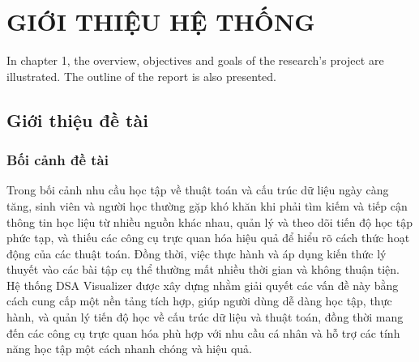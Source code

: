 \chapter{GIỚI THIỆU HỆ THỐNG}
\label{ch:introduction}

In chapter 1, the overview, objectives and goals of the research's project are illustrated. The outline of the report is also presented.

\section{Giới thiệu đề tài}
\label{sec:intro-topic}

\subsection{Bối cảnh đề tài}
\label{subsec:context}

Trong bối cảnh nhu cầu học tập về thuật toán và cấu trúc dữ liệu ngày càng tăng, sinh viên và người học thường gặp khó khăn khi phải tìm kiếm và tiếp cận thông tin học liệu từ nhiều nguồn khác nhau, quản lý và theo dõi tiến độ học tập phức tạp, và thiếu các công cụ trực quan hóa hiệu quả để hiểu rõ cách thức hoạt động của các thuật toán. Đồng thời, việc thực hành và áp dụng kiến thức lý thuyết vào các bài tập cụ thể thường mất nhiều thời gian và không thuận tiện. Hệ thống DSA Visualizer được xây dựng nhằm giải quyết các vấn đề này bằng cách cung cấp một nền tảng tích hợp, giúp người dùng dễ dàng học tập, thực hành, và quản lý tiến độ học về cấu trúc dữ liệu và thuật toán, đồng thời mang đến các công cụ trực quan hóa phù hợp với nhu cầu cá nhân và hỗ trợ các tính năng học tập một cách nhanh chóng và hiệu quả.

